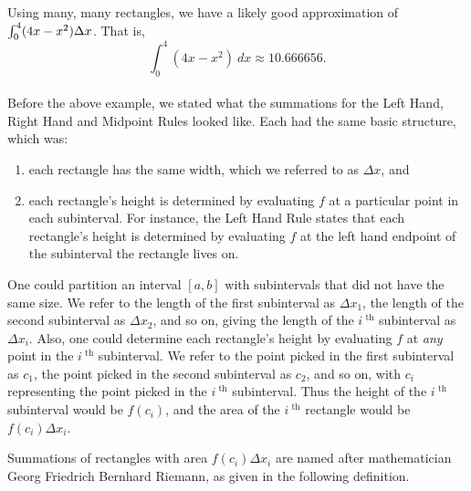 {Using many, many rectangles, we have a likely good approximation of $\int_0^4 (4x-x^2)\Delta x$. That is, $$\int_0^4(4x-x^2)\ dx \approx 10.666656.$$
\baselineskip
}\\

Before the above example, we stated what the summations for the Left Hand, Right Hand and Midpoint Rules looked like. Each had the same basic structure, which was:
\begin{enumerate}
	\item each rectangle has the same width, which we referred to as $\Delta x$, and
	\item	each rectangle's height is determined by evaluating $f$ at a particular point in each subinterval. For instance, the Left Hand Rule states that each rectangle's height is determined by evaluating $f$ at the left hand endpoint of the subinterval the rectangle lives on.
\end{enumerate}
One could partition an interval $[a,b]$ with subintervals that did not have the same size. We refer to the length of the first subinterval as $\Delta x_1$, the length of the second subinterval as $\Delta x_2$, and so on, giving the length of the $i^\text{ th}$ subinterval as $\Delta x_i$. Also, one could determine each rectangle's height by evaluating $f$ at \emph{any} point in the $i^\text{ th}$ subinterval. We refer to the point picked in the first subinterval as $c_1$, the point picked in the second subinterval as $c_2$, and so on, with $c_i$ representing the point picked in the $i^\text{ th}$ subinterval. Thus the height of the $i^\text{ th}$ subinterval would be $f(c_i)$, and the area of the $i^\text{ th}$ rectangle would be $f(c_i)\Delta x_i$.

Summations of rectangles with area $f(c_i)\Delta x_i$ are named after mathematician Georg Friedrich Bernhard Riemann, as given in the following definition.
\enlargethispage{2\baselineskip}



